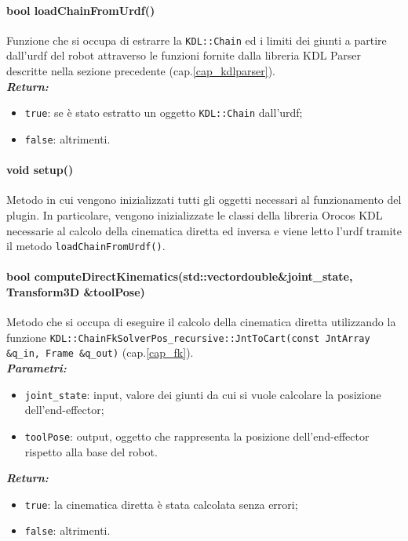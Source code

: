 \paragraph{bool loadChainFromUrdf()}
Funzione che si occupa di estrarre la \texttt{KDL::Chain} ed i limiti dei giunti a partire dall'urdf del robot attraverso le funzioni fornite dalla libreria KDL Parser descritte nella sezione precedente (cap.\ref{cap_kdlparser}).\\
\textbf{\textit{Return:}}
\begin{itemize}
	\item \texttt{true}: se è stato estratto un oggetto \texttt{KDL::Chain} dall'urdf;
	\item \texttt{false}: altrimenti.
\end{itemize}

\paragraph{void setup()}
Metodo in cui vengono inizializzati tutti gli oggetti necessari al funzionamento del plugin. In particolare, vengono inizializzate le classi della libreria Orocos KDL necessarie al calcolo della cinematica diretta ed inversa e viene letto l'urdf tramite il metodo \texttt{loadChainFromUrdf()}.

\paragraph{bool computeDirectKinematics(std::vector\tl double\tr \&joint\_state, Transform3D \&toolPose)}
Metodo che si occupa di eseguire il calcolo della cinematica diretta utilizzando la funzione \texttt{KDL::ChainFkSolverPos\_recursive::JntToCart(const JntArray \&q\_in, Frame \&q\_out)} (cap.\ref{cap_fk}).\\
\textbf{\textit{Parametri:}}
\begin{itemize}
	\item \texttt{joint\_state}: input, valore dei giunti da cui si vuole calcolare la posizione dell'end-effector; 
	\item \texttt{toolPose}: output, oggetto che rappresenta la posizione dell'end-effector rispetto alla base del robot.
\end{itemize}
\textbf{\textit{Return:}}
\begin{itemize}
	\item \texttt{true}: la cinematica diretta è stata calcolata senza errori;
	\item \texttt{false}: altrimenti.
\end{itemize}


